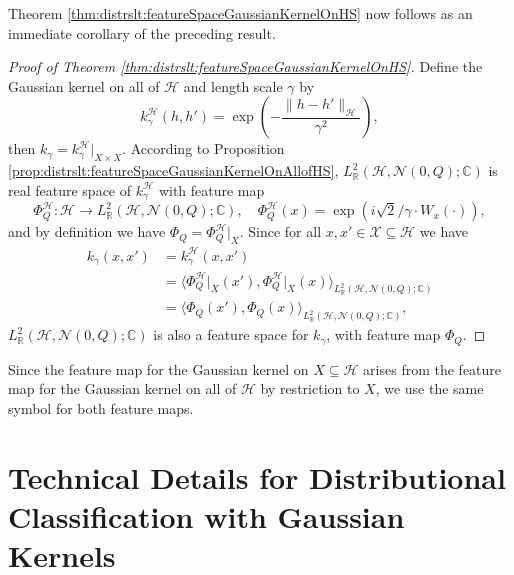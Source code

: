 \documentclass[letterpaper]{article} %
\newcommand{\R}{\mathbb{R}}
\newcommand{\fm}{\Phi} %
\newcommand{\hs}[1]{\mathcal{#1}} %
\newcommand{\inputSet}{\mathcal{X}} %
\newcommand{\Normal}{\mathcal{N}}
\newcommand{\C}{\mathbb{C}}
\begin{document}
Theorem \ref{thm:distrslt:featureSpaceGaussianKernelOnHS} now follows as an immediate corollary of the preceding result.
\begin{proof}[Proof of Theorem \ref{thm:distrslt:featureSpaceGaussianKernelOnHS}]
Define the Gaussian kernel on all of $\hs{H}$ and length scale $\gamma$ by
\begin{equation*}
    k_\gamma^\hs{H}(h,h') = \exp\left(-\frac{\|h-h'\|_\hs{H}}{\gamma^2}\right),
\end{equation*}
then $k_\gamma=k_\gamma^\hs{H}\lvert_{X \times X}$.
According to Proposition \ref{prop:distrslt:featureSpaceGaussianKernelOnAllofHS}, $L^2_\R(\hs{H},\Normal(0,Q);\C)$ is real feature space of $k_\gamma^\hs{H}$ with feature map 
\begin{equation*}
    \fm_Q^\hs{H}: \hs{H}\rightarrow L^2_\R(\hs{H},\Normal(0,Q);\C),
    \quad
    \fm_Q^\hs{H}(x) = \exp(i \sqrt{2}/\gamma \cdot W_x(\cdot)),
\end{equation*}
and by definition we have $\fm_Q = \fm_Q^\hs{H}\lvert_X$.
Since for all $x,x'\in\inputSet\subseteq\hs{H}$ we have
\begin{align*}
    k_\gamma(x,x') & = k_\gamma^\hs{H}(x,x') \\
    & = \langle  \fm_Q^\hs{H}\lvert_X(x'),  \fm_Q^\hs{H}\lvert_X(x) \rangle_{L^2_\R(\hs{H},\Normal(0,Q);\C)} \\
    & = \langle \fm_Q(x'),  \fm_Q(x) \rangle_{L^2_\R(\hs{H},\Normal(0,Q);\C)}, 
\end{align*}
$L^2_\R(\hs{H},\Normal(0,Q);\C)$ is also a feature space for $k_\gamma$, 
with feature map $\fm_Q$.
\end{proof}
Since the feature map for the Gaussian kernel on $X \subseteq\hs{H}$ arises from the feature map for the Gaussian kernel on all of $\hs{H}$ by restriction to $X$, we use the same symbol for both feature maps.
\section{Technical Details for Distributional Classification with Gaussian Kernels}
\end{document}
